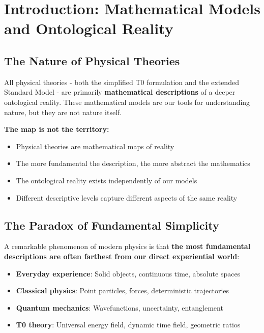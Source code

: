 \section{Introduction: Mathematical Models and Ontological Reality}
	
	\subsection{The Nature of Physical Theories}
	
	All physical theories - both the simplified T0 formulation and the extended Standard Model - are primarily \textbf{mathematical descriptions} of a deeper ontological reality. These mathematical models are our tools for understanding nature, but they are not nature itself.
	
	\begin{tcolorbox}[colback=gray!5!white,colframe=gray!75!black,title=Fundamental Epistemological Insight]
		\textbf{The map is not the territory:}
		\begin{itemize}
			\item Physical theories are mathematical maps of reality
			\item The more fundamental the description, the more abstract the mathematics
			\item The ontological reality exists independently of our models
			\item Different descriptive levels capture different aspects of the same reality
		\end{itemize}
	\end{tcolorbox}
	
	\subsection{The Paradox of Fundamental Simplicity}
	
	A remarkable phenomenon of modern physics is that \textbf{the most fundamental descriptions are often farthest from our direct experiential world}:
	
	\begin{itemize}
		\item \textbf{Everyday experience}: Solid objects, continuous time, absolute spaces
		\item \textbf{Classical physics}: Point particles, forces, deterministic trajectories
		\item \textbf{Quantum mechanics}: Wavefunctions, uncertainty, entanglement
		\item \textbf{T0 theory}: Universal energy field, dynamic time field, geometric ratios
	\end{itemize}
	
